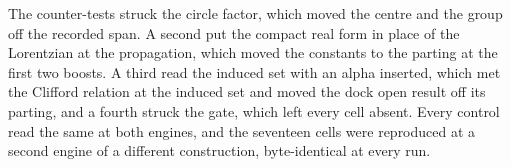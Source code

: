 \begin{chproof}[finite]
The counter-tests struck the circle factor, which moved the centre and the group off the recorded span. A second put the compact real form in place of the Lorentzian at the propagation, which moved the constants to the parting at the first two boosts. A third read the induced set with an alpha inserted, which met the Clifford relation at the induced set and moved the dock open result off its parting, and a fourth struck the gate, which left every cell absent. Every control read the same at both engines, and the seventeen cells were reproduced at a second engine of a different construction, byte-identical at every run.
\end{chproof}
\par\medskip{}\label{narr:close:3-5}\par
